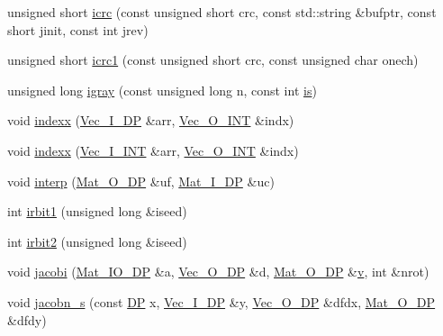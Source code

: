\begin{DoxyCompactItemize}
\item 
unsigned short \mbox{\hyperlink{namespaceNR_a05984f00dc053f5191e68179570e42f0}{icrc}} (const unsigned short crc, const std\+::string \&bufptr, const short jinit, const int jrev)
\item 
unsigned short \mbox{\hyperlink{namespaceNR_a8eecd14f5dbacae9a1c719b3f8d5fe77}{icrc1}} (const unsigned short crc, const unsigned char onech)
\item 
unsigned long \mbox{\hyperlink{namespaceNR_a4965006048ac8b1e627c9e21b9d6c1f8}{igray}} (const unsigned long n, const int \mbox{\hyperlink{x_8cc_a81abbbdef81e25584a2eab888e643d3d}{is}})
\item 
void \mbox{\hyperlink{namespaceNR_a16cc62d4d994e6557e4d85d1b5de0ff9}{indexx}} (\mbox{\hyperlink{namespaceNR_a9f943da53862537c552e2a770cb170ae}{Vec\+\_\+\+I\+\_\+\+DP}} \&arr, \mbox{\hyperlink{namespaceNR_ade2338f6d53b7da3dd6d1c04804541f2}{Vec\+\_\+\+O\+\_\+\+I\+NT}} \&indx)
\item 
void \mbox{\hyperlink{namespaceNR_ab3cd4fa2aeff189dee20cd3f87378212}{indexx}} (\mbox{\hyperlink{namespaceNR_ae67ce7dc86a8a64a7ce73c3c030ff610}{Vec\+\_\+\+I\+\_\+\+I\+NT}} \&arr, \mbox{\hyperlink{namespaceNR_ade2338f6d53b7da3dd6d1c04804541f2}{Vec\+\_\+\+O\+\_\+\+I\+NT}} \&indx)
\item 
void \mbox{\hyperlink{namespaceNR_af65d3c7d1b9eddb10dd001e6456ea45a}{interp}} (\mbox{\hyperlink{namespaceNR_adc1f8da33094b6bbeb1f5f899515ce54}{Mat\+\_\+\+O\+\_\+\+DP}} \&uf, \mbox{\hyperlink{namespaceNR_a2b8abfda8fffad6ba0a1b5a4c0773dbf}{Mat\+\_\+\+I\+\_\+\+DP}} \&uc)
\item 
int \mbox{\hyperlink{namespaceNR_a8847cb5906daead1ccf717166c61b0d7}{irbit1}} (unsigned long \&iseed)
\item 
int \mbox{\hyperlink{namespaceNR_a826f4788e674ad205145876a7ddd04e0}{irbit2}} (unsigned long \&iseed)
\item 
void \mbox{\hyperlink{namespaceNR_ab9427d0f2503bbbc8a531c2e06f9369e}{jacobi}} (\mbox{\hyperlink{namespaceNR_ad1513aa4697878ed3bff0b8b3c9dd910}{Mat\+\_\+\+I\+O\+\_\+\+DP}} \&a, \mbox{\hyperlink{namespaceNR_a970094d23441f8ef6a45282a7eb2103d}{Vec\+\_\+\+O\+\_\+\+DP}} \&d, \mbox{\hyperlink{namespaceNR_adc1f8da33094b6bbeb1f5f899515ce54}{Mat\+\_\+\+O\+\_\+\+DP}} \&\mbox{\hyperlink{adat__devel_2lib_2hadron_2hadron__timeslice_8cc_a716fc87f5e814be3ceee2405ed6ff22a}{v}}, int \&nrot)
\item 
void \mbox{\hyperlink{namespaceNR_a98c0d038f8153db652155a23d8fca0c5}{jacobn\+\_\+s}} (const \mbox{\hyperlink{namespaceNR_af6ff762dd605ff477b8e52387253a02a}{DP}} x, \mbox{\hyperlink{namespaceNR_a9f943da53862537c552e2a770cb170ae}{Vec\+\_\+\+I\+\_\+\+DP}} \&y, \mbox{\hyperlink{namespaceNR_a970094d23441f8ef6a45282a7eb2103d}{Vec\+\_\+\+O\+\_\+\+DP}} \&dfdx, \mbox{\hyperlink{namespaceNR_adc1f8da33094b6bbeb1f5f899515ce54}{Mat\+\_\+\+O\+\_\+\+DP}} \&dfdy)

\end{DoxyCompactItemize}

